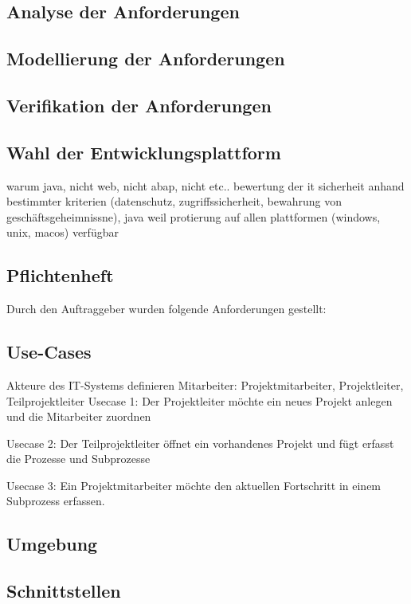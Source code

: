 \subsection{Analyse der Anforderungen}

\subsection{Modellierung der Anforderungen}

\subsection{Verifikation der Anforderungen}

\subsection{Wahl der Entwicklungsplattform}
warum java, nicht web, nicht abap, nicht etc..
bewertung der it sicherheit anhand bestimmter kriterien (datenschutz, zugriffssicherheit, bewahrung von geschäftsgeheimnissne), java weil protierung auf allen plattformen (windows, unix, macos) verfügbar

\subsection{Pflichtenheft}
Durch den Auftraggeber wurden folgende Anforderungen gestellt:

\subsection{Use-Cases}
Akteure des IT-Systems definieren
Mitarbeiter: Projektmitarbeiter, Projektleiter, Teilprojektleiter
Usecase 1:
Der Projektleiter möchte ein neues Projekt anlegen und die Mitarbeiter zuordnen

Usecase 2:
Der Teilprojektleiter öffnet ein vorhandenes Projekt und fügt erfasst die Prozesse und Subprozesse

Usecase 3:
Ein Projektmitarbeiter möchte den aktuellen Fortschritt in einem Subprozess erfassen.

\subsection{Umgebung}
\subsection{Schnittstellen}

